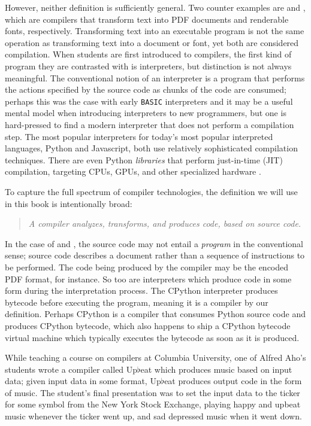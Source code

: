 However, neither definition is sufficiently general.
Two counter examples are \tex and
\metafont, which are compilers that transform text into PDF documents and
renderable fonts, respectively. Transforming text into an executable program is
not the same operation as transforming text into a document or font, yet both
are considered compilation. When students are first introduced to compilers, the
first kind of program they are contrasted with is interpreters, but distinction
is not always meaningful. The conventional notion of an interpreter is a
program that performs the actions specified by the source code as chunks of the
code are consumed; perhaps this was the case with early \texttt{BASIC}
interpreters and it may be a useful mental model when introducing interpreters
to new programmers, but one is hard-pressed to find a modern interpreter that
does not perform a compilation step. The most popular interpreters for today's
most popular interpreted languages, Python and Javascript, both use relatively
sophisticated compilation techniques. There are even Python \textit{libraries}
that perform just-in-time (JIT) compilation, targeting CPUs, GPUs, and other
specialized hardware
\cite{jax-compiler}\cite{lam-numba}\cite{numba_cuda}\cite{triton-tillet}.

\vspace{0.5em}

To capture the full spectrum of compiler technologies, the
definition we will use in this book is intentionally broad:
\begin{quotation}
	\textit{A compiler analyzes, transforms, and produces code, based on source code.}
	\label{def:compiler}
\end{quotation}

In the case of \tex and \metafont, the source code may not entail a
\textit{program} in the conventional sense; \tex source code describes a
document rather than a sequence of instructions to be performed. The code being
produced by the compiler may be the encoded PDF format, for instance. So too are
interpreters which produce code in some form during the interpretation
process. The CPython interpreter produces \gls{bytecode} before executing the
program, meaning it is a compiler by our definition. Perhaps CPython is a
compiler that consumes Python source code and produces CPython bytecode, which also
happens to ship a CPython bytecode virtual machine which typically executes the
bytecode as soon as it is produced.

While teaching a course on compilers at
Columbia University, one of Alfred Aho's students wrote a compiler called
Up$\flat$eat which produces music based on input data; given input data in some
format, Up$\flat$eat produces output code in the form of
music\cite{aho_oral_history_2022}. The student's final presentation was to set
the input data to the ticker for some symbol from the New York Stock Exchange,
playing happy and upbeat music whenever the ticker went up, and sad depressed
music when it went down.

